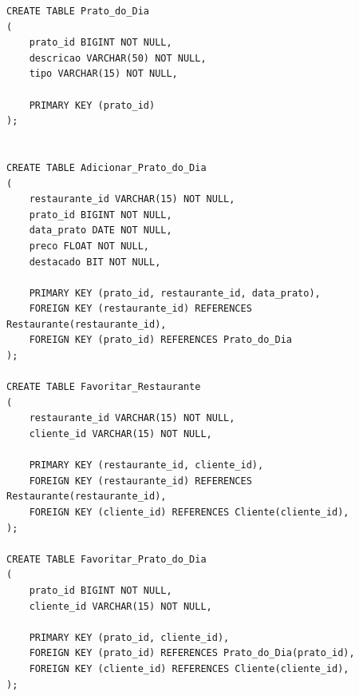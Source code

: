 \documentclass[a4paper,12pt]{report}
\begin{document}
\begin{lstlisting}
CREATE TABLE Prato_do_Dia
(
	prato_id BIGINT NOT NULL,
	descricao VARCHAR(50) NOT NULL,
	tipo VARCHAR(15) NOT NULL,

	PRIMARY KEY (prato_id)
);


CREATE TABLE Adicionar_Prato_do_Dia
(
	restaurante_id VARCHAR(15) NOT NULL,
	prato_id BIGINT NOT NULL,
	data_prato DATE NOT NULL,
	preco FLOAT NOT NULL,
	destacado BIT NOT NULL,

	PRIMARY KEY (prato_id, restaurante_id, data_prato),
	FOREIGN KEY (restaurante_id) REFERENCES Restaurante(restaurante_id),
	FOREIGN KEY (prato_id) REFERENCES Prato_do_Dia
);

CREATE TABLE Favoritar_Restaurante
(
	restaurante_id VARCHAR(15) NOT NULL,
	cliente_id VARCHAR(15) NOT NULL,

	PRIMARY KEY (restaurante_id, cliente_id),
	FOREIGN KEY (restaurante_id) REFERENCES Restaurante(restaurante_id),
	FOREIGN KEY (cliente_id) REFERENCES Cliente(cliente_id),
);

CREATE TABLE Favoritar_Prato_do_Dia
(
	prato_id BIGINT NOT NULL,
	cliente_id VARCHAR(15) NOT NULL,

	PRIMARY KEY (prato_id, cliente_id),
	FOREIGN KEY (prato_id) REFERENCES Prato_do_Dia(prato_id),
	FOREIGN KEY (cliente_id) REFERENCES Cliente(cliente_id),
);
\end{lstlisting}

	
\end{document}

